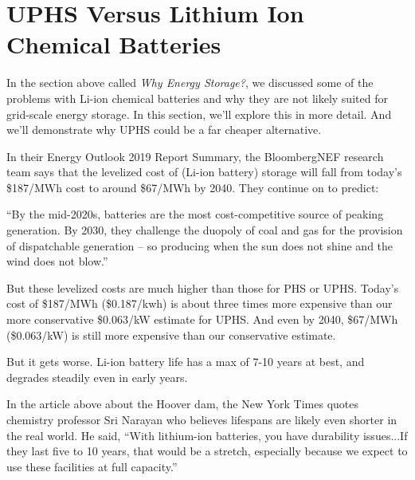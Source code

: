 \documentclass[hidelinks,12pt,a4paper]{article}
\begin{document}
\pagebreak[1]
\section{UPHS Versus Lithium Ion Chemical Batteries}
In the section above called \textit{Why Energy Storage?}, we discussed some of the problems with Li-ion chemical batteries and why they are not likely suited for grid-scale energy storage. In this section, we'll explore this in more detail. And we'll demonstrate why UPHS could be a far cheaper alternative.

In their Energy Outlook 2019 Report Summary, the BloombergNEF research team says that the levelized cost of (Li-ion battery) storage will fall from today's \$187/MWh cost to around \$67/MWh by 2040. \cite{NewEnergyOutlook2019Report} They continue on to predict:

\begin{displayquote}
“By the mid-2020s, batteries are the most cost-competitive source of peaking generation. By 2030, they challenge the duopoly of coal and gas for the provision of dispatchable generation – so producing when the sun does not shine and the wind does not blow.”
\end{displayquote}

But these levelized costs are much higher than those for PHS or UPHS.
Today's cost of \$187/MWh (\$0.187/kwh) is about three times more expensive than our more conservative \$0.063/kW estimate for UPHS. And even by 2040, \$67/MWh (\$0.063/kW) is still more expensive than our conservative estimate.

But it gets worse. Li-ion battery life has a max of 7-10 years at best, and degrades steadily even in early years. \cite{LifePredictionModelForLiIonBattery}

In the article above about the Hoover dam, the New York Times quotes chemistry professor Sri Narayan who believes lifespans are likely even shorter in the real world. He said, “With lithium-ion batteries, you have durability issues...If they last five to 10 years, that would be a stretch, especially because we expect to use these facilities at full capacity.” \cite{The3BillionPlanToTurnHooverDamIntoAGiantBattery}
\end{document}
